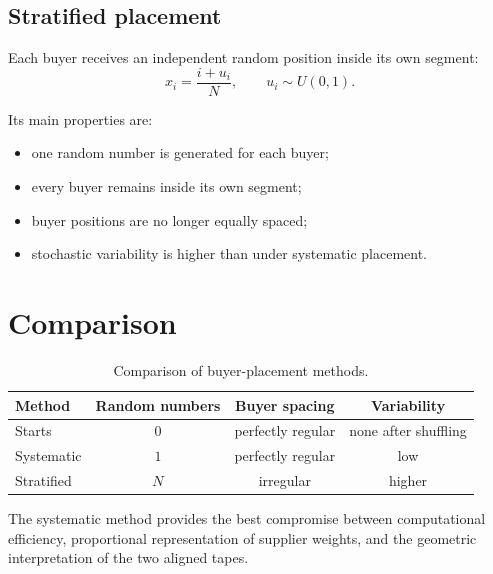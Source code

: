 \documentclass[11pt,a4paper]{article}
\begin{document}
\subsection{Stratified placement}

Each buyer receives an independent random position inside its own segment:
\[
x_i=\frac{i+u_i}{N},
\qquad u_i\sim U(0,1).
\]

Its main properties are:

\begin{itemize}
    \item one random number is generated for each buyer;
    \item every buyer remains inside its own segment;
    \item buyer positions are no longer equally spaced;
    \item stochastic variability is higher than under systematic placement.
\end{itemize}

\section{Comparison}

\begin{table}[htbp]
\centering
\begin{tabular}{lccc}
\toprule
Method & Random numbers & Buyer spacing & Variability \\
\midrule
Starts      & \(0\)   & perfectly regular & none after shuffling \\
Systematic  & \(1\)   & perfectly regular & low \\
Stratified  & \(N\)   & irregular          & higher \\
\bottomrule
\end{tabular}
\caption{Comparison of buyer-placement methods.}
\end{table}

The systematic method provides the best compromise between computational
efficiency, proportional representation of supplier weights, and the
geometric interpretation of the two aligned tapes.
\end{document}
